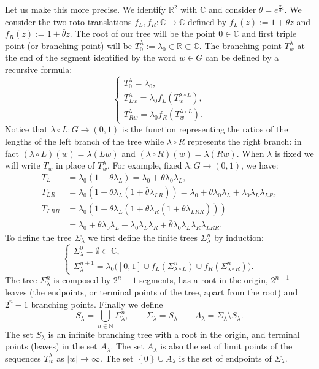 \documentclass{amsart}
\newcommand{\RR}{\mathbb R}
\newcommand{\CC}{\mathbb C}
\newcommand{\NN}{\mathbb N}
\newcommand{\abs}[1]{\left\vert #1 \right\vert}
\newcommand{\ENCLOSE}[1]{\left\{#1\right\}}
\theoremstyle{definition}
\theoremstyle{remark}
\begin{document}
Let us make this more precise.
We identify $\RR^2$ with $\CC$ and consider $\theta=e^{\frac{\pi}{3}i}$.
We consider the two roto-translations $f_L,f_R\colon \CC\to \CC$ defined by 
$f_L(z):= 1+\theta z$ and $f_R(z):=1+\bar\theta z$.
The root of our tree will be the point $0\in \CC$ and first triple point (or branching point) will be 
$T_0^\lambda:=\lambda_0\in \RR\subset \CC$. 
The branching point $T_w^\lambda$ at the end of the segment identified by the word $w\in G$ can be defined by a recursive formula:
\[
   \begin{cases}
    T_0^\lambda = \lambda_0, \\
    T_{Lw}^\lambda = \lambda_0 f_L(T_w^{\lambda\circ L}), \\
    T_{Rw}^\lambda = \lambda_0 f_R(T_w^{\lambda\circ L}).
   \end{cases}
\]
Notice that $\lambda\circ L\colon G \to (0,1)$ is the function representing the ratios of the lengths of the left branch of the tree 
while $\lambda\circ R$ represents the right branch: 
in fact $(\lambda\circ L)(w) = \lambda(Lw)$ and $(\lambda\circ R)(w) = \lambda(Rw)$.
When $\lambda$ is fixed we will write $T_w$ in place of $T_w^\lambda$.
For example, fixed $\lambda\colon G\to(0,1)$, we have: 
\begin{align*}
  T_L &= \lambda_0 (1+\theta \lambda_L) = \lambda_0+\theta \lambda_0\lambda_L,\\
  T_{LR} &= \lambda_0(1+\theta\lambda_L(1+\bar \theta\lambda_{LR})) 
    = \lambda_0 + \theta \lambda_0\lambda_L + \lambda_0\lambda_L\lambda_{LR},\\
  T_{LRR} &= \lambda_0 (1+ \theta \lambda_L(1+\bar \theta \lambda_R(1+\bar \theta \lambda_{LRR}))) \\
    &= \lambda_0 + \theta \lambda_0\lambda_L + \lambda_0\lambda_L\lambda_R + \bar\theta \lambda_0\lambda_L\lambda_R\lambda_{LRR}.
\end{align*}
To define the tree $\Sigma_\lambda$ we first define the finite trees $\Sigma_\lambda^n$ by induction:
\[
\begin{cases}
  \Sigma_\lambda^0 = \emptyset \subset \CC, \\
  \Sigma_\lambda^{n+1} = \lambda_0\big([0,1] \cup f_L(\Sigma_{\lambda\circ L}^n) \cup f_R(\Sigma_{\lambda\circ R}^n)\big).
\end{cases}
\]
The tree $\Sigma_\lambda^n$ is composed by $2^n-1$ segments, has a root in the origin, 
$2^{n-1}$ leaves
(the endpoints, or terminal points of the tree, apart from the root)
and $2^n-1$ branching points.
Finally we define
\[
  S_\lambda = \bigcup_{n\in \NN} \Sigma_\lambda^n,
  \qquad
  \Sigma_\lambda = \overline{S_\lambda}
  \qquad
  A_\lambda = \Sigma_\lambda \setminus S_\lambda.
\]
The set $S_\lambda$ is an infinite branching tree with a root in the origin, 
and terminal points (leaves) in the set $A_\lambda$.
The set $A_\lambda$ is also the set of limit points of the sequences $T^\lambda_w$ as $\abs{w}\to\infty$. 
The set $\ENCLOSE{0}\cup A_\lambda$ is the set of endpoints of $\Sigma_\lambda$.
\end{document}

